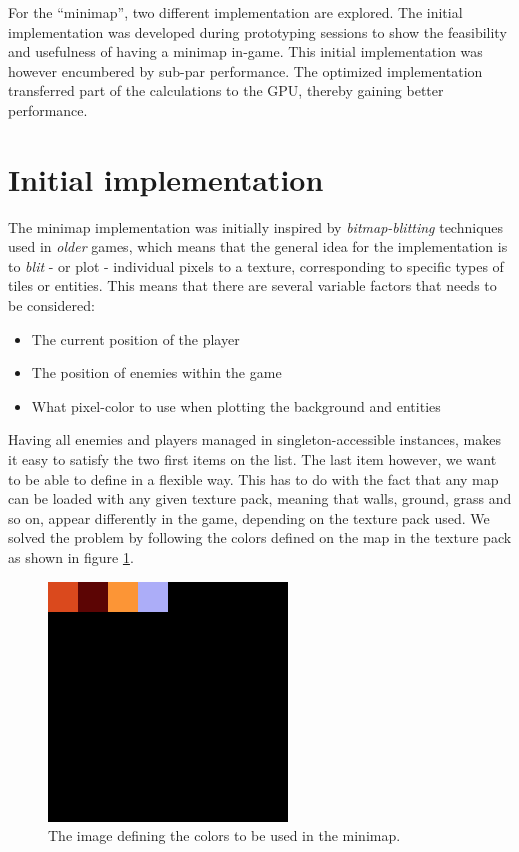 For the ``minimap'', two different implementation are explored. 
The initial implementation was developed during prototyping sessions to show the feasibility and usefulness of having a minimap in-game. 
This initial implementation was however encumbered by sub-par performance.
The optimized implementation transferred part of the calculations to the GPU, thereby gaining better performance.

\section{Initial implementation}
The minimap implementation was initially inspired by \textit{bitmap-blitting}
techniques used in \textit{older} games\cite{bitmap-blitting}, which means that the general idea for
the implementation is to \textit{blit} - or plot - individual pixels to a
texture, corresponding to specific types of tiles or entities. This means that
there are several variable factors that needs to be considered:
\begin{itemize}
    \item The current position of the player
    \item The position of enemies within the game 
    \item What pixel-color to use when plotting the background and entities
\end{itemize}
Having all enemies and players managed in singleton-accessible instances,
makes it easy to satisfy the two first items on the list. The last item
however, we want to be able to define in a flexible way. This
has to do with the fact that any map can be loaded with any given
texture pack, meaning that walls, ground, grass and so on, appear differently
in the game, depending on the texture pack used.
We solved the problem by following the colors defined on the map in the texture pack as shown in figure \ref{minimap:colordefinition}.
\\
\begin{figure}
	\centering
    \includegraphics[scale=.5]{figures/minimap/minimap_colors.png}
    \caption{The image defining the colors to be used in the minimap.}
    \label{minimap:colordefinition}
\end{figure}

